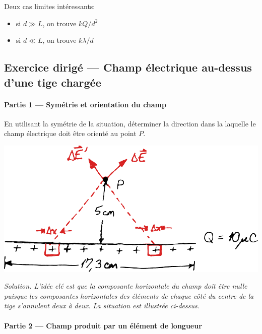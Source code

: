 Deux cas limites intéressants:

\begin{itemize}
  \item si $d \gg L$, on trouve $kQ/d^2$
  \item si $d \ll L$, on trouve $k\lambda / d$
\end{itemize}


\sectionline



\subsection*{Exercice dirigé --- Champ électrique au-dessus d'une tige chargée}

\paragraph{Partie 1 --- Symétrie et orientation du champ}

En utilisant la symétrie de la situation, déterminer la direction dans la
laquelle le champ électrique doit être orienté au point $P$.

\begin{center}
  \includegraphics[scale=0.5]{02-champ-electrique/figures/champ-fil-3.pdf}
\end{center}


\textit{Solution. L'idée clé est que la composante horizontale du champ doit
  être nulle puisque les composantes horizontales des éléments de chaque côté
  du centre de la tige s'annulent deux à deux. La situation est illustrée
  ci-dessus.}

\paragraph{Partie 2 --- Champ produit par un élément de longueur}

